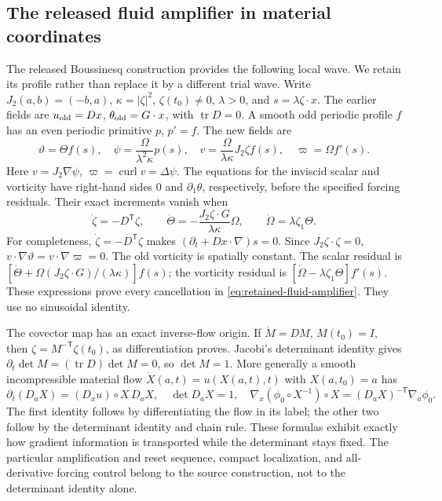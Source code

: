 \subsection{The released fluid amplifier in material coordinates}
The released Boussinesq construction\cite[Section~3.1, Lemma~3.1]{ab2026boussinesq}
provides the following local wave. We retain its profile rather than
replace it by a different trial wave. Write $J_2(a,b)=(-b,a)$,
$\kappa=|\zeta|^2$, $\zeta(t_0)\ne0$, $\lambda>0$, and
$s=\lambda\zeta\cdot x$.
The earlier fields are $u_{\rm old}=Dx$, $\theta_{\rm old}=G\cdot x$,
with $\operatorname{tr}D=0$. A smooth odd periodic profile $f$ has
an even periodic primitive $p$, $p'=f$. The new fields are
\[
 \vartheta=\Theta f(s),\quad
 \psi=\frac{\Omega}{\lambda^2\kappa}p(s),\quad
 v=\frac{\Omega}{\lambda\kappa}J_2\zeta f(s),\quad
 \varpi=\Omega f'(s).
\]
Here $v=J_2\nabla\psi$, $\varpi=\operatorname{curl}v=\Delta\psi$.
The equations for the inviscid scalar and vorticity have right-hand
sides $0$ and $\partial_1\theta$, respectively, before the specified
forcing residuals. Their exact increments vanish when
\begin{equation}
 \dot\zeta=-D^{\mathsf T}\zeta,\qquad
 \dot\Theta=-\frac{J_2\zeta\cdot G}{\lambda\kappa}\Omega,
 \qquad \dot\Omega=\lambda\zeta_1\Theta.
 \label{eq:retained-fluid-amplifier}
\end{equation}
For completeness, $\dot\zeta=-D^{\mathsf T}\zeta$ makes
$(\partial_t+Dx\cdot\nabla)s=0$. Since $J_2\zeta\cdot\zeta=0$,
$v\cdot\nabla\vartheta=v\cdot\nabla\varpi=0$.
The old vorticity is spatially constant. The scalar residual is
$[\dot\Theta+\Omega(J_2\zeta\cdot G)/(\lambda\kappa)]f(s)$;
the vorticity residual is $[\dot\Omega-\lambda\zeta_1\Theta]f'(s)$.
These expressions prove every cancellation in
\eqref{eq:retained-fluid-amplifier}. They use no sinusoidal identity.

The covector map has an exact inverse-flow origin. If
$\dot M=DM$, $M(t_0)=I$, then
$\zeta=M^{-\mathsf T}\zeta(t_0)$, as differentiation proves.
Jacobi's determinant identity gives
$\partial_t\det M=(\operatorname{tr}D)\det M=0$, so $\det M=1$.
More generally a smooth incompressible material flow
$\dot X(a,t)=u(X(a,t),t)$ with $X(a,t_0)=a$ has
\[
 \partial_t(D_aX)=(D_xu)\circ X\,D_aX,
 \quad \det D_aX=1,
 \quad \nabla_x(\phi_0\circ X^{-1})\circ X
       =(D_aX)^{-\mathsf T}\nabla_a\phi_0.
\]
The first identity follows by differentiating the flow in its label;
the other two follow by the determinant identity and chain rule.
These formulas exhibit exactly how gradient information is transported
while the determinant stays fixed. The particular amplification and
reset sequence, compact localization, and all-derivative forcing control
belong to the source construction, not to the determinant identity alone.

